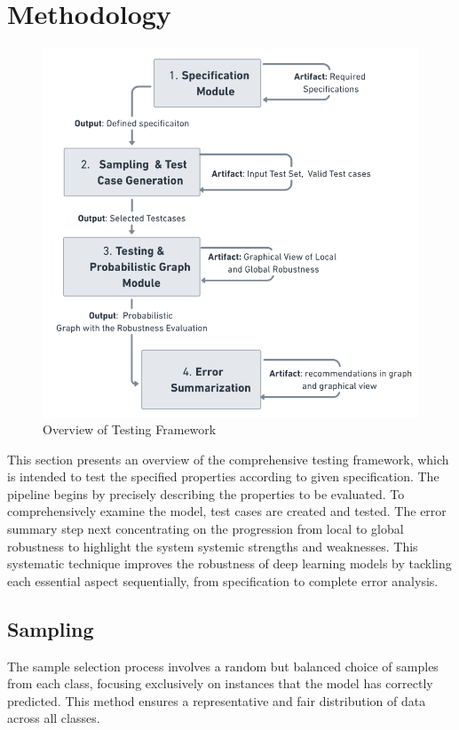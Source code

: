 \documentclass[10pt, conference, a4paper, final]{IEEEtran}
\begin{document}
\section{Methodology}
\begin{figure}{}
    \centering
    \includegraphics[width=\linewidth]{paper_images/framework.png}
    \caption{Overview of Testing Framework}
    \label{fig:graph}
\end{figure}


This section presents an overview of the comprehensive testing framework, which is intended to test the specified properties according to given specification. The pipeline begins by precisely describing the properties to be evaluated. To comprehensively examine the model, test cases are created and tested. The error summary step next concentrating on the progression from local to global robustness to highlight the system systemic strengths and weaknesses. This systematic technique improves the robustness of deep learning models by tackling each essential aspect sequentially, from specification to complete error analysis.

\subsection{Sampling}
 The sample selection process involves a random but balanced choice of samples from each class, focusing exclusively on instances that the model has correctly predicted. This method ensures a representative and fair distribution of data across all classes.
\end{document}
